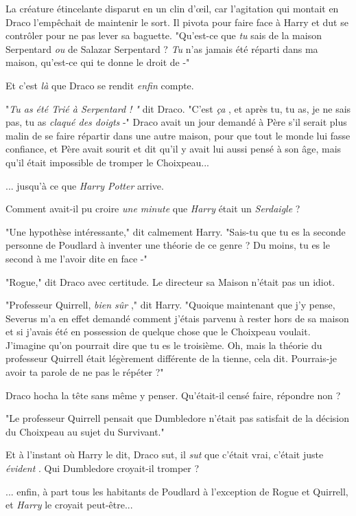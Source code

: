 La créature étincelante disparut en un clin d'œil, car l'agitation qui montait en Draco l'empêchait de maintenir le sort. Il pivota pour faire face à Harry et dut se contrôler pour ne pas lever sa baguette. "Qu'est-ce que \emph{tu}  sais de la maison Serpentard \emph{ou}  de Salazar Serpentard ? \emph{Tu}  n'as jamais été réparti dans ma maison, qu'est-ce qui te donne le droit de -"

Et c'est \emph{là}  que Draco se rendit \emph{enfin}  compte.

"\emph{Tu as été Trié à Serpentard ! "}  dit Draco. "C'est \emph{ça} , et après tu, tu as, je ne sais pas, tu as \emph{claqué des doigts}  -" Draco avait un jour demandé à Père s'il serait plus malin de se faire répartir dans une autre maison, pour que tout le monde lui fasse confiance, et Père avait sourit et dit qu'il y avait lui aussi pensé à son âge, mais qu'il était impossible de tromper le Choixpeau...

... jusqu'à ce que \emph{Harry Potter}  arrive.

Comment avait-il pu croire \emph{une minute}  que \emph{Harry}  était un \emph{Serdaigle}  ?

"Une hypothèse intéressante," dit calmement Harry. "Sais-tu que tu es la seconde personne de Poudlard à inventer une théorie de ce genre ? Du moins, tu es le second à me l'avoir dite en face -"

"Rogue," dit Draco avec certitude. Le directeur sa Maison n'était pas un idiot.

"Professeur Quirrell, \emph{bien sûr} ," dit Harry. "Quoique maintenant que j'y pense, Severus m'a en effet demandé comment j'étais parvenu à rester hors de sa maison et si j'avais été en possession de quelque chose que le Choixpeau voulait. J'imagine qu'on pourrait dire que tu es le troisième. Oh, mais la théorie du professeur Quirrell était légèrement différente de la tienne, cela dit. Pourrais-je avoir ta parole de ne pas le répéter ?"

Draco hocha la tête sans même y penser. Qu'était-il censé faire, répondre non ?

"Le professeur Quirrell pensait que Dumbledore n'était pas satisfait de la décision du Choixpeau au sujet du Survivant."

Et à l'instant où Harry le dit, Draco sut, il \emph{sut}  que c'était vrai, c'était juste \emph{évident} . Qui Dumbledore croyait-il tromper ?

... enfin, à part tous les habitants de Poudlard à l'exception de Rogue et Quirrell, et \emph{Harry}  le croyait peut-être...

